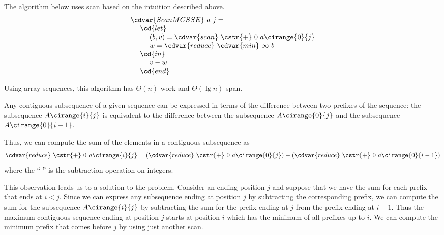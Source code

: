 \begin{flex}
\begin{algorithm}
\label{alg:mcss::reduction:mcsse}
The algorithm below uses scan based on the
intuition described above. 
%
\[
\begin{array}{l}
\cdvar{ScanMCSSE}~a~j=
\\
~~~~\cd{let}
\\
~~~~~~~~(b,v) = \cdvar{scan}~\cstr{+}~0~a\cirange{0}{j}
\\
~~~~~~~~w= \cdvar{reduce}~\cdvar{min}~\infty~b
\\
~~~~\cd{in}
\\
~~~~~~~~v - w 
\\
~~~~\cd{end}
\end{array}
\]


Using array sequences, this algorithm has $\Theta(n)$ work and
$\Theta(\lg n)$ span.
\end{algorithm}
%

\begin{gram}
\label{gr:mcss::reduction::mcsse:simple::intuition}

Any contiguous subsequence of a given sequence can be expressed in
terms of the difference between two prefixes of the sequence:
%
the subsequence $A\cirange{i}{j}$ is equivalent to the difference
between the subsequence $A\cirange{0}{j}$ and the subsequence
$A\cirange{0}{i-1}$.
%

Thus, we can compute the sum of the elements in
a contiguous subsequence as
\[
\cdvar{reduce}~\cstr{+}~0~a\cirange{i}{j}
= 
\left(\cdvar{reduce}~\cstr{+}~0~a\cirange{0}{j}\right)
- 
\left(\cdvar{reduce}~\cstr{+}~0~a\cirange{0}{i-1}\right)
\]
where the ``-'' is the subtraction operation on integers.

This observation leads us to a solution to the \MCSSE{} problem.
%
Consider an ending position $j$ and suppose that we have
the sum for each prefix that ends at $i < j$.
%
Since we can express any subsequence ending at position $j$ by
subtracting the corresponding prefix, we can compute the sum for the
subsequence $A\cirange{i}{j}$ by subtracting the sum for the prefix
ending at $j$ from the prefix ending at $i-1$.
%
Thus the maximum contiguous sequence ending at position $j$ starts at
position $i$ which has the minimum of all prefixes up to $i$.
%
%
We can compute the minimum prefix that comes before $j$ by using just
another scan.  
%
%
\end{gram}
\end{flex}
%


